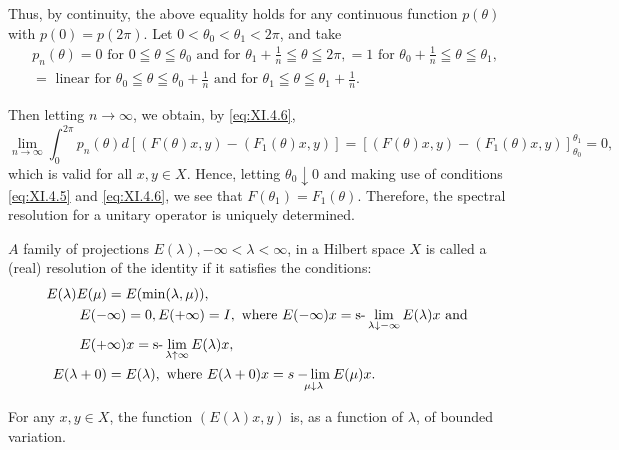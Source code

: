 Thus, by continuity, the above equality holds for any continuous function $p(\theta)$ with $p(0) = p(2\pi)$. Let $0 < \theta_{0} < \theta_{1} < 2\pi$, and take 
\[
\begin{aligned}
&p _{n} (\theta)  = 0 \text{ for } 0 \leqq \theta \leqq \theta_{0} \text{ and for } \theta_{1} + \frac {1}{n} \leqq \theta \leqq 2 \pi , = 1 \text{ for } \theta_{0} + \frac {1}{n} \leqq \theta \leqq \theta_{1}, \\
&= \text{ linear for } \theta_{0} \leqq \theta \leqq \theta_{0} + \frac {1}{n} \text{ and for } \theta_{1} \leqq \theta \leqq \theta_{1} + \frac {1}{n}.
\end{aligned}
\]

Then letting $n \to \infty$, we obtain, by \eqref{eq:XI.4.6}, 
\[
\lim\limits _{n \rightarrow \infty} \int_{0} ^{2 \pi} p _{n} (\theta) d [ (F (\theta) x, y) - (F _{1} (\theta) x, y) ] = [ (F (\theta) x, y) - (F _{1} (\theta) x, y) ] _ {\theta_{0}} ^ {\theta_{1}} = 0,
\]
which is valid for all $x, y \in X$. Hence, letting $\theta_{0} \downarrow 0$ and making use of conditions \eqref{eq:XI.4.5} and \eqref{eq:XI.4.6}, we see that $F(\theta_{1}) = F_{1}(\theta)$. Therefore, the spectral resolution for a unitary operator is uniquely determined. 


\label{sec:XI.5}

\begin{definition}\label{def:XI.5.Definition.1} $A$ family of projections $E(\lambda), -\infty < \lambda < \infty$, in a Hilbert space $X$ is called a (real) resolution of the identity if it satisfies the conditions: 
\begin{align}
E (\lambda) E (\mu)& = E (\min (\lambda , \mu)), \label{eq:XI.5.1} \\
E (-& \infty) = 0, E (+ \infty) = I, \text{ where } E (- \infty) x = \text{s-}\lim _{\lambda \downarrow - \infty} E (\lambda) x \text{ and } \notag \\
E (+& \infty) x = \text{s-}\lim _{\lambda \uparrow \infty} E (\lambda) x, \label{eq:XI.5.2} \\
E (\lambda + 0)& = E (\lambda), \text{ where } E (\lambda + 0) x = s \underset {\mu \downarrow \lambda} {- \lim} E (\mu) x. \label{eq:XI.5.3}
\end{align}
\end{definition}

\begin{proposition}\label{prop:XI.5.Proposition.1} For any $x, y \in X$, the function $(E(\lambda)x, y)$ is, as a function of $\lambda$, of bounded variation. 
\end{proposition}

